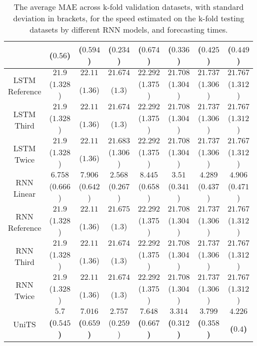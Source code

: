 \begin{table}[!ht]
{\begin{tabular}{|c|c|c|c|c|c|c|c|}
			 & ($0.56$) & ($0.594$) & \textbf{(}$\mathbf{0.234}$\textbf{)} & ($0.674$) & ($0.336$) & ($0.425$) & ($0.449$) \\ \hline
			\multirow{2}{*}{LSTM Reference} & $21.9$ & $22.11$ & $21.674$ & $22.292$ & $21.708$ & $21.737$ & $21.767$ \\
			 & ($1.328$) & ($1.36$) & ($1.3$) & ($1.375$) & ($1.304$) & ($1.306$) & ($1.312$) \\ \hline
			\multirow{2}{*}{LSTM Third} & $21.9$ & $22.11$ & $21.674$ & $22.292$ & $21.708$ & $21.737$ & $21.767$ \\
			 & ($1.328$) & ($1.36$) & ($1.3$) & ($1.375$) & ($1.304$) & ($1.306$) & ($1.312$) \\ \hline
			\multirow{2}{*}{LSTM Twice} & $21.9$ & $22.11$ & $21.683$ & $22.292$ & $21.708$ & $21.737$ & $21.767$ \\
			 & ($1.328$) & ($1.36$) & ($1.306$) & ($1.375$) & ($1.304$) & ($1.306$) & ($1.312$) \\ \hline
			\multirow{2}{*}{RNN Linear} & $6.758$ & $7.906$ & $2.568$ & $8.445$ & $3.51$ & $4.289$ & $4.906$ \\
			 & ($0.666$) & ($0.642$) & ($0.267$) & ($0.658$) & ($0.341$) & ($0.437$) & ($0.471$) \\ \hline
			\multirow{2}{*}{RNN Reference} & $21.9$ & $22.11$ & $21.675$ & $22.292$ & $21.708$ & $21.737$ & $21.767$ \\
			 & ($1.328$) & ($1.36$) & ($1.3$) & ($1.375$) & ($1.304$) & ($1.306$) & ($1.312$) \\ \hline
			\multirow{2}{*}{RNN Third} & $21.9$ & $22.11$ & $21.674$ & $22.292$ & $21.708$ & $21.737$ & $21.767$ \\
			 & ($1.328$) & ($1.36$) & ($1.3$) & ($1.375$) & ($1.304$) & ($1.306$) & ($1.312$) \\ \hline
			\multirow{2}{*}{RNN Twice} & $21.9$ & $22.11$ & $21.674$ & $22.292$ & $21.708$ & $21.737$ & $21.767$ \\
			 & ($1.328$) & ($1.36$) & ($1.3$) & ($1.375$) & ($1.304$) & ($1.306$) & ($1.312$) \\ \hline
			\multirow{2}{*}{UniTS} & $\mathbf{5.7}$ & $\mathbf{7.016}$ & $2.757$ & $\mathbf{7.648}$ & $\mathbf{3.314}$ & $\mathbf{3.799}$ & $\mathbf{4.226}$ \\
			 & \textbf{(}$\mathbf{0.545}$\textbf{)} & \textbf{(}$\mathbf{0.659}$\textbf{)} & ($0.259$) & \textbf{(}$\mathbf{0.667}$\textbf{)} & \textbf{(}$\mathbf{0.312}$\textbf{)} & \textbf{(}$\mathbf{0.358}$\textbf{)} & \textbf{(}$\mathbf{0.4}$\textbf{)} \\ \hline
		\end{tabular}
	}
	\caption{The average MAE across k-fold validation datasets, with standard deviation in brackets, for the speed estimated on the k-fold testing datasets by different RNN models, and forecasting times.}
	\label{tab:all_speed_MAE}
\end{table}